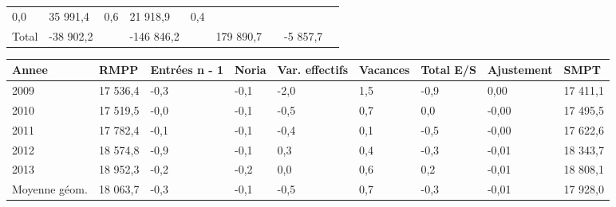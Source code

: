\begin{longtable}[]{@{}lllllllll@{}}
\begin{minipage}[t]{0.06\columnwidth}
0,0\strut
\end{minipage} & \begin{minipage}[t]{0.12\columnwidth}\raggedright
35 991,4\strut
\end{minipage} & \begin{minipage}[t]{0.06\columnwidth}\raggedright
0,6\strut
\end{minipage} & \begin{minipage}[t]{0.08\columnwidth}\raggedright
21 918,9\strut
\end{minipage} & \begin{minipage}[t]{0.06\columnwidth}\raggedright
0,4\strut
\end{minipage}\tabularnewline
\begin{minipage}[t]{0.05\columnwidth}\raggedright
Total\strut
\end{minipage} & \begin{minipage}[t]{0.10\columnwidth}\raggedright
-38 902,2\strut
\end{minipage} & \begin{minipage}[t]{0.06\columnwidth}\raggedright
\strut
\end{minipage} & \begin{minipage}[t]{0.17\columnwidth}\raggedright
-146 846,2\strut
\end{minipage} & \begin{minipage}[t]{0.06\columnwidth}\raggedright
\strut
\end{minipage} & \begin{minipage}[t]{0.12\columnwidth}\raggedright
179 890,7\strut
\end{minipage} & \begin{minipage}[t]{0.06\columnwidth}\raggedright
\strut
\end{minipage} & \begin{minipage}[t]{0.08\columnwidth}\raggedright
-5 857,7\strut
\end{minipage} & \begin{minipage}[t]{0.06\columnwidth}\raggedright
\strut
\end{minipage}\tabularnewline
\bottomrule
\end{longtable}

\begin{longtable}[]{@{}lllllllll@{}}
\toprule
Annee & RMPP & Entrées n - 1 & Noria & Var. effectifs & Vacances & Total
E/S & Ajustement & SMPT\tabularnewline
\midrule
\endhead
2009 & 17 536,4 & -0,3 & -0,1 & -2,0 & 1,5 & -0,9 & 0,00 & 17
411,1\tabularnewline
2010 & 17 519,5 & -0,0 & -0,1 & -0,5 & 0,7 & 0,0 & -0,00 & 17
495,5\tabularnewline
2011 & 17 782,4 & -0,1 & -0,1 & -0,4 & 0,1 & -0,5 & -0,00 & 17
622,6\tabularnewline
2012 & 18 574,8 & -0,9 & -0,1 & 0,3 & 0,4 & -0,3 & -0,01 & 18
343,7\tabularnewline
2013 & 18 952,3 & -0,2 & -0,2 & 0,0 & 0,6 & 0,2 & -0,01 & 18
808,1\tabularnewline
Moyenne géom. & 18 063,7 & -0,3 & -0,1 & -0,5 & 0,7 & -0,3 & -0,01 & 17
928,0\tabularnewline
\bottomrule
\end{longtable}

